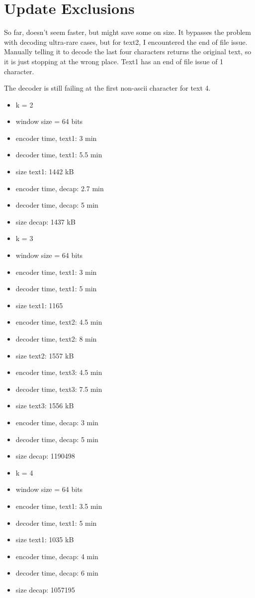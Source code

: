 \documentclass{article}
\begin{document}
\section{Update Exclusions}

So far, doesn't seem faster, but might save some on size. It bypasses the problem with decoding ultra-rare cases, but for text2, I encountered the end of file issue. Manually telling it to decode the last four characters returns the original text, so it is just stopping at the wrong place. Text1 has an end of file issue of 1 character.

The decoder is still failing at the first non-ascii character for text 4.

\begin{itemize}
\item k = 2
\item window size = 64 bits
\item encoder time, text1: 3 min
\item decoder time, text1: 5.5 min
\item size text1: 1442 kB
\item encoder time, decap: 2.7 min
\item decoder time, decap: 5 min
\item size decap: 1437 kB
\end{itemize}

\begin{itemize}
\item k = 3
\item window size = 64 bits
\item encoder time, text1: 3 min
\item decoder time, text1: 5 min
\item size text1: 1165
\item encoder time, text2: 4.5 min
\item decoder time, text2: 8 min
\item size text2: 1557 kB
\item encoder time, text3: 4.5 min
\item decoder time, text3: 7.5 min
\item size text3: 1556 kB
\item encoder time, decap: 3 min
\item decoder time, decap: 5 min
\item size decap: 1190498
\end{itemize}

\begin{itemize}
\item k = 4
\item window size = 64 bits
\item encoder time, text1: 3.5 min
\item decoder time, text1: 5 min
\item size text1: 1035 kB
\item encoder time, decap: 4 min
\item decoder time, decap: 6 min
\item size decap: 1057195
\end{itemize}
\end{document}
